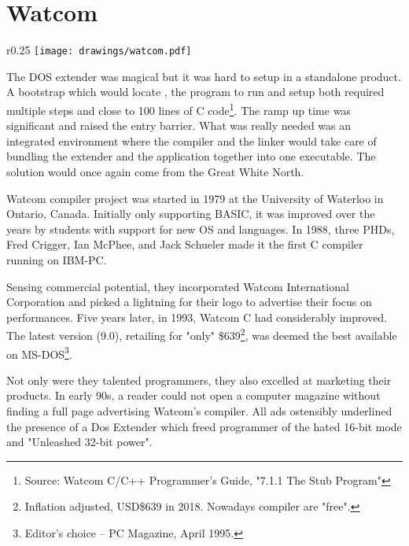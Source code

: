 \section{Watcom}

\begin{wrapfigure}[9]{r}{0.25\textwidth}
\centering
\texttt{[image: drawings/watcom.pdf]}
\end{wrapfigure}


The DOS extender was magical but it was hard to setup in a standalone product. A bootstrap which would locate , the program to run and setup both required multiple steps and close to 100 lines of C code\footnote{Source: Watcom C/C++ Programmer's Guide, "7.1.1 The Stub Program"}. The ramp up time was significant and raised the entry barrier. What was really needed was an integrated environment where the compiler and the linker would take care of bundling the extender and the application together into one executable. The solution would once again come from the Great White North.\\ 
\par

Watcom compiler project was started in 1979 at the University of Waterloo in Ontario, Canada. Initially only supporting BASIC, it was improved over the years by students with support for new OS and languages. In 1988, three PHDs, Fred Crigger, Ian McPhee, and Jack Schueler made it the first C compiler running on IBM-PC.\\
\par
Sensing commercial potential, they incorporated Watcom International Corporation and picked a lightning for their logo to advertise their focus on performances. Five years later, in 1993, Watcom C had considerably improved. The latest version (9.0), retailing for "only" \$639\footnote{Inflation adjusted, USD\$639 in 2018. Nowadays compiler are "free".},  was deemed the best available on MS-DOS\footnote{Editor's choice -- PC Magazine, April 1995.}. \\
\par
Not only were they talented programmers, they also excelled at marketing their products. In early 90s, a reader could not open a computer magazine without finding a full page advertising Watcom's compiler. All ads ostensibly underlined the presence of a Dos Extender which freed programmer of the hated 16-bit mode and "Unleashed 32-bit power".
\par
\label{watcomad}



